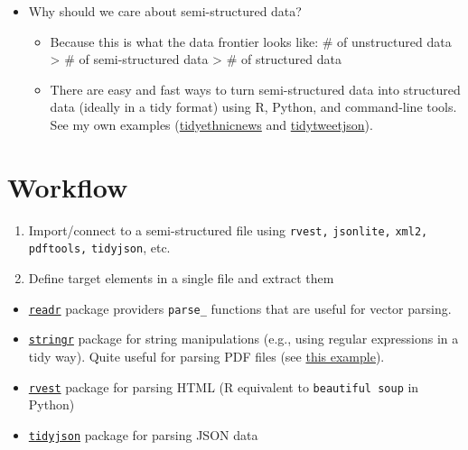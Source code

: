 \documentclass[
]{book}
\providecommand{\tightlist}{%
  \setlength{\itemsep}{0pt}\setlength{\parskip}{0pt}}
\begin{document}
\begin{itemize}
\item
  Why should we care about semi-structured data?

  \begin{itemize}
  \tightlist
  \item
    Because this is what the data frontier looks like: \# of unstructured data \textgreater{} \# of semi-structured data \textgreater{} \# of structured data
  \item
    There are easy and fast ways to turn semi-structured data into structured data (ideally in a tidy format) using R, Python, and command-line tools. See my own examples (\href{https://github.com/jaeyk/tidyethnicnews}{tidyethnicnews} and \href{https://github.com/jaeyk/tidytweetjson}{tidytweetjson}).
  \end{itemize}
\end{itemize}

\hypertarget{workflow-2}{%
\section{Workflow}\label{workflow-2}}

\begin{enumerate}
\def\labelenumi{\arabic{enumi}.}
\item
  Import/connect to a semi-structured file using \texttt{rvest,} \texttt{jsonlite,} \texttt{xml2,} \texttt{pdftools,} \texttt{tidyjson}, etc.
\item
  Define target elements in a single file and extract them
\end{enumerate}

\begin{itemize}
\item
  \href{https://readr.tidyverse.org/}{\texttt{readr}} package providers \texttt{parse\_} functions that are useful for vector parsing.
\item
  \href{https://stringr.tidyverse.org/}{\texttt{stringr}} package for string manipulations (e.g., using regular expressions in a tidy way). Quite useful for parsing PDF files (see \href{https://themockup.blog/posts/2020-04-03-beer-and-pdftools-a-vignette/}{this example}).
\item
  \href{https://github.com/tidyverse/rvest}{\texttt{rvest}} package for parsing HTML (R equivalent to \texttt{beautiful\ soup} in Python)
\item
  \href{https://github.com/sailthru/tidyjson}{\texttt{tidyjson}} package for parsing JSON data
\end{itemize}
\end{document}
